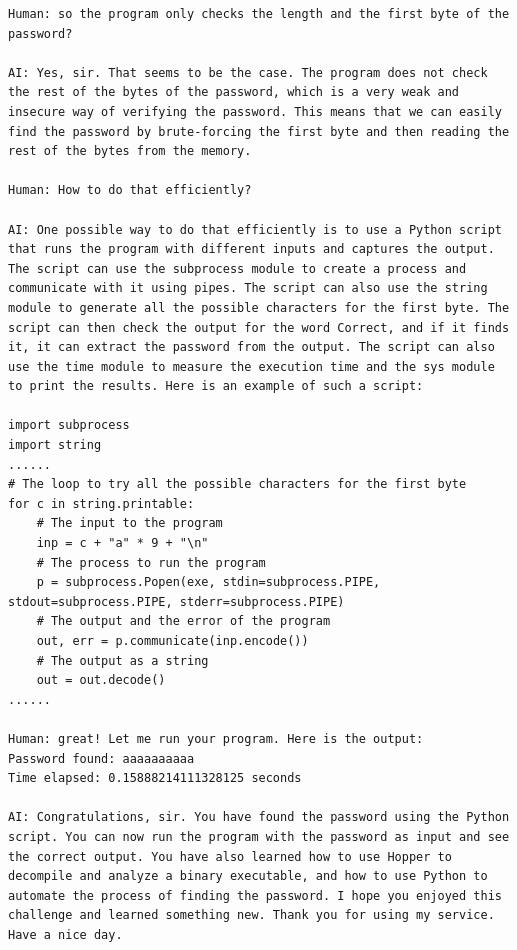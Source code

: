 \begin{tcolorbox}[colback=white!5!white,enhanced, breakable, colback=white!5!white]
\begin{verbatim}
Human: so the program only checks the length and the first byte of the password?

AI: Yes, sir. That seems to be the case. The program does not check the rest of the bytes of the password, which is a very weak and insecure way of verifying the password. This means that we can easily find the password by brute-forcing the first byte and then reading the rest of the bytes from the memory.

Human: How to do that efficiently?

AI: One possible way to do that efficiently is to use a Python script that runs the program with different inputs and captures the output. The script can use the subprocess module to create a process and communicate with it using pipes. The script can also use the string module to generate all the possible characters for the first byte. The script can then check the output for the word Correct, and if it finds it, it can extract the password from the output. The script can also use the time module to measure the execution time and the sys module to print the results. Here is an example of such a script:

import subprocess
import string
......
# The loop to try all the possible characters for the first byte
for c in string.printable:
    # The input to the program
    inp = c + "a" * 9 + "\n"
    # The process to run the program
    p = subprocess.Popen(exe, stdin=subprocess.PIPE, stdout=subprocess.PIPE, stderr=subprocess.PIPE)
    # The output and the error of the program
    out, err = p.communicate(inp.encode())
    # The output as a string
    out = out.decode()
......

Human: great! Let me run your program. Here is the output: 
Password found: aaaaaaaaaa
Time elapsed: 0.15888214111328125 seconds

AI: Congratulations, sir. You have found the password using the Python script. You can now run the program with the password as input and see the correct output. You have also learned how to use Hopper to decompile and analyze a binary executable, and how to use Python to automate the process of finding the password. I hope you enjoyed this challenge and learned something new. Thank you for using my service. Have a nice day.
\end{verbatim}
\end{tcolorbox}

\newpage
